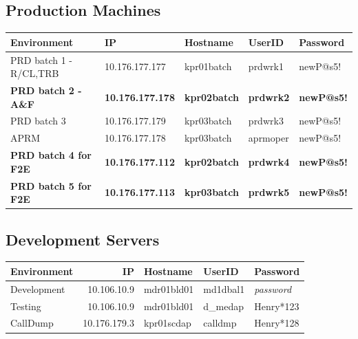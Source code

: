 \documentclass[12pt,twoside]{article}
\begin{document}
\subsection{Production Machines}
\label{sec-3-3}

\footnotesize

\begin{center}
\begin{tabular}{lllll}
\hline
 \textbf{Environment}          &  \textbf{IP}              &  \textbf{Hostname}    &  \textbf{UserID}   &  \textbf{Password}  \\
\hline
 PRD batch 1 - R/CL,TRB        &  10.176.177.177           &  kpr01batch           &  prdwrk1           &  newP@s5!           \\
 \textbf{PRD batch 2 - A\&F}   &  \textbf{10.176.177.178}  &  \textbf{kpr02batch}  &  \textbf{prdwrk2}  &  \textbf{newP@s5!}  \\
 PRD batch 3                   &  10.176.177.179           &  kpr03batch           &  prdwrk3           &  newP@s5!           \\
 APRM                          &  10.176.177.178           &  kpr03batch           &  aprmoper          &  newP@s5!           \\
 \textbf{PRD batch 4 for F2E}  &  \textbf{10.176.177.112}  &  \textbf{kpr02batch}  &  \textbf{prdwrk4}  &  \textbf{newP@s5!}  \\
 \textbf{PRD batch 5 for F2E}  &  \textbf{10.176.177.113}  &  \textbf{kpr03batch}  &  \textbf{prdwrk5}  &  \textbf{newP@s5!}  \\
\hline
\end{tabular}
\end{center}


\normalsize
\subsection{Development Servers}
\label{sec-3-4}

\footnotesize

\begin{center}
\begin{tabular}{lrlll}
\hline
 \textbf{Environment}  &   \textbf{IP}  &  \textbf{Hostname}  &  \textbf{UserID}  &  \textbf{Password}  \\
\hline
 Development           &   10.106.10.9  &  mdr01bld01         &  md1dbal1         &  \emph{password}    \\
 Testing               &   10.106.10.9  &  mdr01bld01         &  d_medap          &  Henry*123          \\
 CallDump              &  10.176.179.3  &  kpr01scdap         &  calldmp          &  Henry*128          \\
\hline
\end{tabular}
\end{center}
\end{document}
